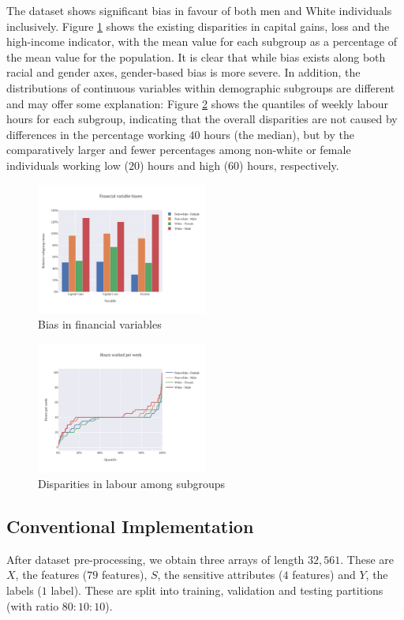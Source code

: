 \documentclass[conference]{IEEEtran}
\begin{document}
The dataset shows significant bias in favour of both men and White individuals inclusively. Figure \ref{fig:fin_bias} shows the existing disparities in capital gains, loss and the high-income indicator, with the mean value for each subgroup as a percentage of the mean value for the population. It is clear that while bias exists along both racial and gender axes, gender-based bias is more severe. In addition, the distributions of continuous variables within demographic subgroups are different and may offer some explanation: Figure \ref{fig:hour_bias} shows the quantiles of weekly labour hours for each subgroup, indicating that the overall disparities are not caused by differences in the percentage working $40$ hours (the median), but by the comparatively larger and fewer percentages among non-white or female individuals working low ($20$) hours and high ($60$) hours, respectively.

\begin{figure}[h]
    \centering
    \includegraphics[width=0.5\textwidth]{images/fin_bias.pdf}
    \caption{Bias in financial variables}
    \label{fig:fin_bias}
\end{figure}

\begin{figure}[h]
    \centering
    \includegraphics[width=0.5\textwidth]{images/hours_bias.pdf}
    \caption{Disparities in labour among subgroups}
    \label{fig:hour_bias}
\end{figure}

\subsection{Conventional Implementation}
After dataset pre-processing, we obtain three arrays of length $32,561$. These are $X$, the features ($79$ features), $S$, the sensitive attributes ($4$ features) and $Y$, the labels ($1$ label). These are split into training, validation and testing partitions (with ratio $80:10:10$).
\end{document}
